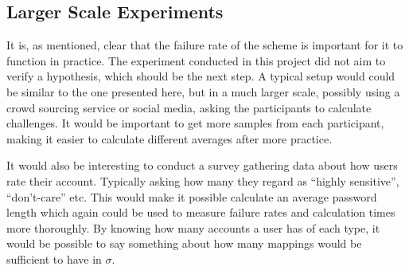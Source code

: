 \subsection{Larger Scale Experiments}
It is, as mentioned, clear that the failure rate of the scheme is important for it to function in practice. The experiment conducted in this project did not aim to verify a hypothesis, which should be the next step. A typical setup would could be similar to the one presented here, but in a much larger scale, possibly using a crowd sourcing service or social media, asking the participants to calculate challenges. It would be important to get more samples from each participant, making it easier to calculate different averages after more practice.  
\par It would also be interesting to conduct a survey gathering data about how users rate their account. Typically asking how many they regard as ``highly sensitive'', ``don't-care'' etc. This would make it possible calculate an average password length which again could be used to measure failure rates and calculation times more thoroughly. By knowing how many accounts a user has of each type, it would be possible to say something about how many mappings would be sufficient to have in $\sigma$. 
